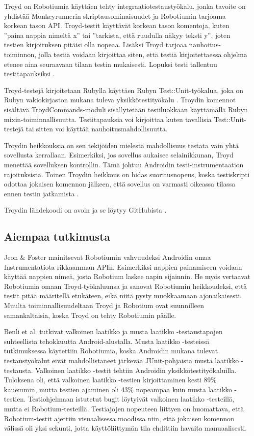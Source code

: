 Troyd on Robotiumia käyttäen tehty integraatiotestaustyökalu, jonka tavoite on yhdistää Monkeyrunnerin skriptausominaisuudet ja Robotiumin tarjoama korkean tason API. Troyd-testit käyttävät korkean tason komentoja, kuten ''paina nappia nimeltä x''  tai ''tarkista, että ruudulla näkyy teksti y'', joten testien kirjoituksen pitäisi olla nopeaa. Lisäksi Troyd tarjoaa nauhoitus-toiminnon, jolla testiä voidaan kirjoittaa siten, että testiä kirjoitettaessa ohjelma etenee aina seuraavaan tilaan testin mukaisesti. Lopuksi testi tallentuu testitapauksiksi \cite{troyd}.

Troyd-testejä kirjoitetaan Rubylla käyttäen Rubyn Test::Unit-työkalua, joka on Rubyn vakiokirjaston mukana tuleva yksikkötestityökalu \cite{testunit}. Troydin komennot sisältävä TroydCommands-moduli sisällytetään testiluokkaan käyttämällä Rubyn mixin-toiminnallisuutta. Testitapauksia voi kirjoittaa kuten tavallisia Test::Unit-testejä tai sitten voi käyttää nauhoitusmahdollisuutta.

Troydin heikkouksia on sen tekijöiden mielestä mahdollisuus testata vain yhtä sovellusta kerrallaan. Esimerkiksi, jos sovellus aukaisee selainikkunan, Troyd menettää sovelluksen kontrollin. Tämä johtuu Androidin testi-instrumentaation rajoituksista. Toinen Troydin heikkous on hidas suoritusnopeus, koska testiskripti odottaa jokaisen komennon jälkeen, että sovellus on varmasti oikeassa tilassa ennen testin jatkamista \cite{troyd}.

Troydin lähdekoodi on avoin ja se löytyy GitHubista \cite{troyd_github}.

\subsection{Aiempaa tutkimusta}

Jeon \& Foster \cite{troyd} mainitsevat Robotiumin vahvuudeksi Androidin omaa Instrumentatiota rikkaamman APIn. Esimerkiksi nappien painamiseen voidaan käyttää nappien nimeä, josta Robotium laskee napin sijainnin. He myös vertaavat Robotiumia omaan Troyd-työkaluunsa ja sanovat Robotiumin heikkoudeksi, että testit pitää määritellä etukäteen, eikä niitä pysty muokkaamaan ajonaikaisesti. Muulta toiminnallisuudeltaan Troyd ja Robotium ovat suunnilleen samankaltaisia, koska Troyd on tehty Robotiumin päälle.

Benli et al. \cite{benli12} tutkivat valkoinen laatikko ja musta laatikko -testaustapojen suhteellista tehokkuutta Android-alustalla. Musta laatikko -testeissä tutkimuksessa käytettiin Robotiumia, koska Androidin mukana tulevat testaustyökalut eivät mahdollistaneet järkevää JUnit-pohjaista musta laatikko -testausta. Valkoinen laatikko -testit tehtiin Androidin yksikkötestityökaluilla. Tuloksena oli, että valkoinen laatikko -testien kirjoittaminen kesti 89\% kauemmin, mutta testien ajaminen oli 43\% nopeampaa kuin musta laatikko -testien. Testiohjelmaan istutetut bugit löytyivät valkoinen laatikko -testeillä, mutta ei Robotium-testeillä. Testiajojen nopeuteen liittyen on huomattava, että Robotium-testit ajettiin visuaalisessa moodissa niin, että jokaisen komennon välissä oli yksi sekunti, jotta käyttöliittymän tila ehdittiin havaita manuaalisesti.


